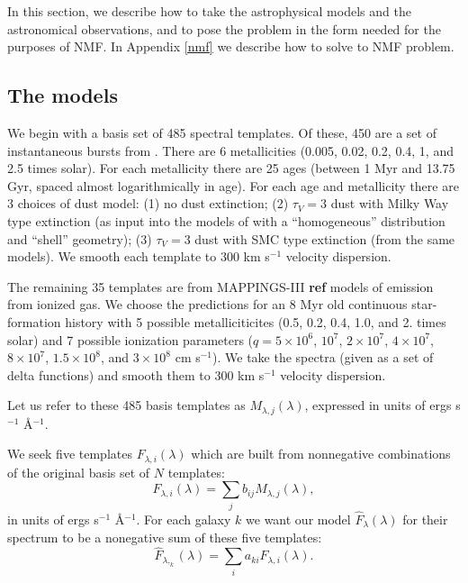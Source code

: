 \documentclass[10pt,preprint]{aastex}
\begin{document}
In this section, we describe how to take the astrophysical
models and the astronomical observations, and to pose the problem in
the form needed for the purposes of NMF. In Appendix \ref{nmf} we describe
how to solve to NMF problem.

\subsection{The models}

We begin with a basis set of 485 spectral templates. Of these, 450 are
a set of instantaneous bursts from \citet{bruzual03a}. There are 6
metallicities (0.005, 0.02, 0.2, 0.4, 1, and 2.5 times solar). For
each metallicity there are 25 ages (between 1 Myr and 13.75 Gyr,
spaced almost logarithmically in age).  For each age and metallicity
there are 3 choices of dust model: (1) no dust extinction; (2) $\tau_V
= 3$ dust with Milky Way type extinction (as input into the models of
\citealt{witt00a} with a ``homogeneous'' distribution and ``shell''
geometry); (3) $\tau_V = 3$ dust with SMC type extinction (from the
same models). We smooth each template to $300$ km s$^{-1}$ velocity
dispersion. 

The remaining 35 templates are from MAPPINGS-III {\bf ref} models of
emission from ionized gas. We choose the predictions for an 8 Myr old
continuous star-formation history with 5 possible metalliciticites
(0.5, 0.2, 0.4, 1.0, and 2. times solar) and 7 possible ionization
parameters ($q= 5\times 10^6$, $10^7$, $2\times 10^7$, $4\times 10^7$,
$8 \times 10^7$, $1.5\times 10^8$, and $3\times 10^8$ cm s$^{-1}$). We
take the spectra (given as a set of delta functions) and smooth them
to $300$ km s$^{-1}$ velocity dispersion.

Let us refer to these 485 basis templates as $M_{\lambda,
j}(\lambda)$, expressed in units of ergs s$^{-1}$ \AA$^{-1}$.

We seek five templates $F_{\lambda, i}(\lambda)$ which are built from
nonnegative combinations of the original basis set of $N$ templates:
\begin{equation}
F_{\lambda, i}(\lambda) = \sum_j b_{ij} M_{\lambda, j}(\lambda),
\end{equation}
in units of ergs s$^{-1}$ \AA$^{-1}$.  For each galaxy $k$
we want our model ${\hat{F}_\lambda}(\lambda)$ for their spectrum to
be a nonegative sum of these five templates:
\begin{equation}
{\hat{F}}_{\lambda,_k}(\lambda) = \sum_i a_{ki} F_{\lambda,i}(\lambda).
\end{equation}
\end{document}

